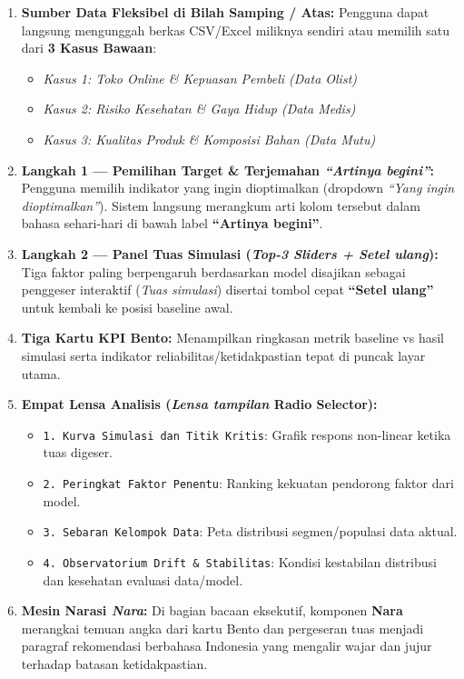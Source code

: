 \documentclass[11pt,a4paper,oneside]{book}
\newcommand{\code}[1]{{\small\nolinkurl{#1}}}
\begin{document}
\begin{enumerate}
  \item \textbf{Sumber Data Fleksibel di Bilah Samping / Atas:} Pengguna dapat langsung mengunggah berkas CSV/Excel miliknya sendiri atau memilih satu dari \textbf{3 Kasus Bawaan}:
    \begin{itemize}
      \item \emph{Kasus 1: Toko Online \& Kepuasan Pembeli (Data Olist)}
      \item \emph{Kasus 2: Risiko Kesehatan \& Gaya Hidup (Data Medis)}
      \item \emph{Kasus 3: Kualitas Produk \& Komposisi Bahan (Data Mutu)}
    \end{itemize}
  \item \textbf{Langkah 1 --- Pemilihan Target \& Terjemahan \emph{``Artinya begini''}:} Pengguna memilih indikator yang ingin dioptimalkan (dropdown \emph{``Yang ingin dioptimalkan''}). Sistem langsung merangkum arti kolom tersebut dalam bahasa sehari-hari di bawah label \textbf{``Artinya begini''}.
  \item \textbf{Langkah 2 --- Panel Tuas Simulasi (\emph{Top-3 Sliders + Setel ulang}):} Tiga faktor paling berpengaruh berdasarkan model disajikan sebagai penggeser interaktif (\emph{Tuas simulasi}) disertai tombol cepat \textbf{``Setel ulang''} untuk kembali ke posisi baseline awal.
  \item \textbf{Tiga Kartu KPI Bento:} Menampilkan ringkasan metrik baseline vs hasil simulasi serta indikator reliabilitas/ketidakpastian tepat di puncak layar utama.
  \item \textbf{Empat Lensa Analisis (\emph{Lensa tampilan} Radio Selector):}
    \begin{itemize}
      \item \code{1. Kurva Simulasi dan Titik Kritis}: Grafik respons non-linear ketika tuas digeser.
      \item \code{2. Peringkat Faktor Penentu}: Ranking kekuatan pendorong faktor dari model.
      \item \code{3. Sebaran Kelompok Data}: Peta distribusi segmen/populasi data aktual.
      \item \texttt{4. Observatorium Drift \& Stabilitas}: Kondisi kestabilan distribusi dan kesehatan evaluasi data/model.
    \end{itemize}
  \item \textbf{Mesin Narasi \emph{Nara}:} Di bagian bacaan eksekutif, komponen \textbf{Nara} merangkai temuan angka dari kartu Bento dan pergeseran tuas menjadi paragraf rekomendasi berbahasa Indonesia yang mengalir wajar dan jujur terhadap batasan ketidakpastian.
\end{enumerate}
\end{document}
